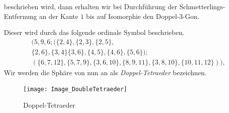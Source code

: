 \documentclass[12pt,titlepage,twoside,cleardoublepage]{article}
\theoremstyle{nummermitklammern}
\numberwithin{equation}{section}
\begin{document}
 beschrieben wird, dann erhalten wir bei Durchführung der Schmetterlings-Entfernung an der Kante $1$ bis auf Isomorphie den Doppel-3-Gon. 

 Dieser wird durch das folgende ordinale Symbol beschrieben.
 \begin{align*}
 &(5,9,6;(\{2,4\},\{2,3\},\{2,5\},\\
 &\{2,6\},\{3,4\}\{3,6\},\{4,5\},\{4,6\},\{5,6\});\\
 &(\{6,7,12\},\{5,7,9\},\{3,6,10\},\{8,9,11\},\{3,8,10\},\{10,11,12\})),
 \end{align*}
 Wir werden die Sphäre von nun an als \emph{Doppel-Tetraeder} bezeichnen.
 \begin{figure}[H]
\begin{center}
\texttt{[image: Image\_DoubleTetraeder]}
\end{center}
\caption{Doppel-Tetraeder}
\end{figure}
\end{document}
